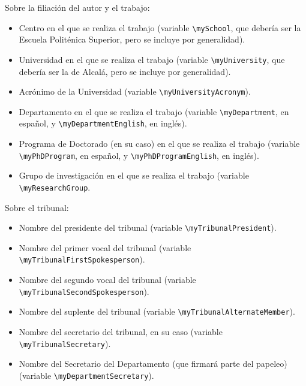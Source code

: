Sobre la filiación del autor y el trabajo:

\begin{itemize}

  \item Centro en el que se realiza el trabajo (variable \texttt{\textbackslash{}mySchool}, que debería ser la Escuela Politénica Superior, pero se incluye por generalidad).
  \item Universidad en el que se realiza el trabajo (variable \texttt{\textbackslash{}myUniversity}, que debería ser la de Alcalá, pero se incluye por generalidad).
  \item Acrónimo de la Universidad (variable \texttt{\textbackslash{}myUniversityAcronym}).

  \item Departamento en el que se realiza el trabajo (variable \texttt{\textbackslash{}myDepartment}, en español, y \texttt{\textbackslash{}myDepartmentEnglish}, en inglés).
  
  \item Programa de Doctorado (en su caso) en el que se realiza el trabajo (variable \texttt{\textbackslash{}myPhDProgram}, en español, y \texttt{\textbackslash{}myPhDProgramEnglish}, en inglés).
  \item Grupo de investigación en el que se realiza el trabajo (variable \texttt{\textbackslash{}myResearchGroup}.

\end{itemize}

Sobre el tribunal:

\begin{itemize}

  \item Nombre del presidente del tribunal (variable \texttt{\textbackslash{}myTribunalPresident}).
  \item Nombre del primer vocal del tribunal (variable \texttt{\textbackslash{}myTribunalFirstSpokesperson}).
  \item Nombre del segundo vocal del tribunal (variable \texttt{\textbackslash{}myTribunalSecondSpokesperson}).
  \item Nombre del suplente del tribunal (variable \texttt{\textbackslash{}myTribunalAlternateMember}).
  \item Nombre del secretario del tribunal, en su caso (variable \texttt{\textbackslash{}myTribunalSecretary}).
  \item Nombre del Secretario del Departamento (que firmará parte del papeleo) (variable \texttt{\textbackslash{}myDepartmentSecretary}).

\end{itemize}

